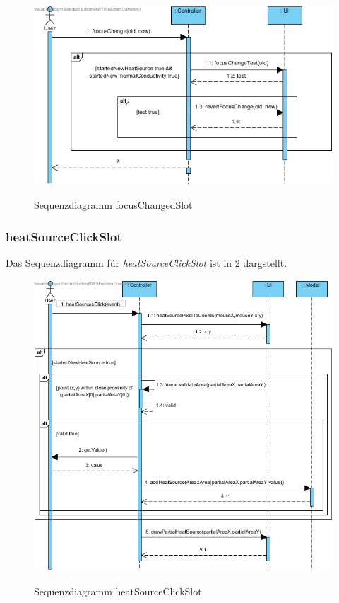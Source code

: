 \begin{figure}[H]
	\centering
	\includegraphics[scale=.6]{Bilder/Controller__focusChangeSlot().jpg}\\
	\caption{Sequenzdiagramm focusChangedSlot}
	\label{Sequenzdiagramm focusChangedSlot}
\end{figure}

\subsubsection*{heatSourceClickSlot}

Das Sequenzdiagramm für \emph{heatSourceClickSlot} ist in \ref{Sequenzdiagramm heatSourceClickSlot} dargstellt.

\begin{figure}[H]
	\centering
	\includegraphics[scale=.6]{Bilder/Controller__heatSourcesClickSlot().jpg}\\
	\caption{Sequenzdiagramm heatSourceClickSlot}
	\label{Sequenzdiagramm heatSourceClickSlot}
\end{figure}

